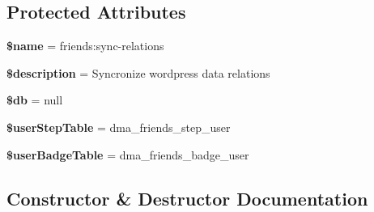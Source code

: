 \subsection*{Protected Attributes}
\begin{DoxyCompactItemize}
\item 
\hypertarget{classDMA_1_1Friends_1_1Commands_1_1SyncFriendsRelationsCommand_a0f2f9249d994c50002e593c9250d8940}{}{\bfseries \$name} = \textquotesingle{}friends\+:sync-\/relations\textquotesingle{}\label{classDMA_1_1Friends_1_1Commands_1_1SyncFriendsRelationsCommand_a0f2f9249d994c50002e593c9250d8940}

\item 
\hypertarget{classDMA_1_1Friends_1_1Commands_1_1SyncFriendsRelationsCommand_aa15d7cb86809962d2c857c75d803114a}{}{\bfseries \$description} = \textquotesingle{}Syncronize wordpress data relations\textquotesingle{}\label{classDMA_1_1Friends_1_1Commands_1_1SyncFriendsRelationsCommand_aa15d7cb86809962d2c857c75d803114a}

\item 
\hypertarget{classDMA_1_1Friends_1_1Commands_1_1SyncFriendsRelationsCommand_a0f80681225760f8800c68595db90e238}{}{\bfseries \$db} = null\label{classDMA_1_1Friends_1_1Commands_1_1SyncFriendsRelationsCommand_a0f80681225760f8800c68595db90e238}

\item 
\hypertarget{classDMA_1_1Friends_1_1Commands_1_1SyncFriendsRelationsCommand_afede3d36037ec94d313e2382b9103896}{}{\bfseries \$user\+Step\+Table} = \textquotesingle{}dma\+\_\+friends\+\_\+step\+\_\+user\textquotesingle{}\label{classDMA_1_1Friends_1_1Commands_1_1SyncFriendsRelationsCommand_afede3d36037ec94d313e2382b9103896}

\item 
\hypertarget{classDMA_1_1Friends_1_1Commands_1_1SyncFriendsRelationsCommand_a4cabd040654272373d0d6828d4967529}{}{\bfseries \$user\+Badge\+Table} = \textquotesingle{}dma\+\_\+friends\+\_\+badge\+\_\+user\textquotesingle{}\label{classDMA_1_1Friends_1_1Commands_1_1SyncFriendsRelationsCommand_a4cabd040654272373d0d6828d4967529}

\end{DoxyCompactItemize}


\subsection{Constructor \& Destructor Documentation}
\hypertarget{classDMA_1_1Friends_1_1Commands_1_1SyncFriendsRelationsCommand_a199c1e86fcdeb44b66c5b3150cb737ad}{}
